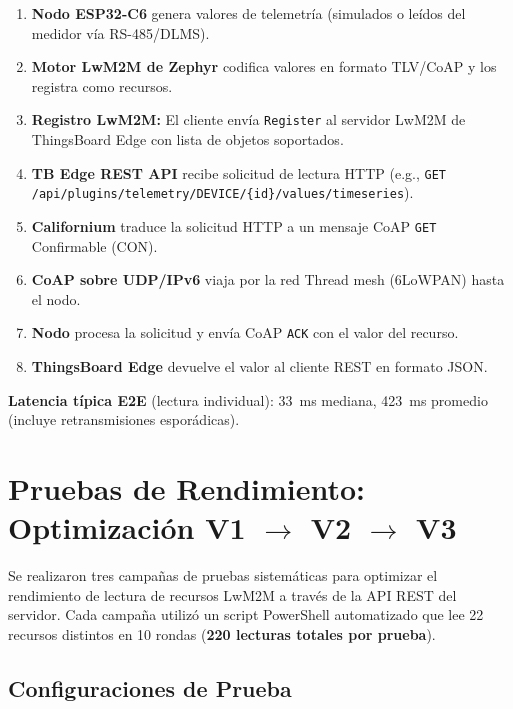 \documentclass[11pt,a4paper]{article}
\begin{document}
\begin{enumerate}[leftmargin=1.5cm]
    \item \textbf{Nodo ESP32-C6} genera valores de telemetría (simulados o leídos del medidor vía RS-485/DLMS).
    \item \textbf{Motor LwM2M de Zephyr} codifica valores en formato TLV/CoAP y los registra como recursos.
    \item \textbf{Registro LwM2M:} El cliente envía \texttt{Register} al servidor LwM2M de ThingsBoard Edge con lista de objetos soportados.
    \item \textbf{TB Edge REST API} recibe solicitud de lectura HTTP (e.g., \texttt{GET /api/plugins/telemetry/DEVICE/\{id\}/values/timeseries}).
    \item \textbf{Californium} traduce la solicitud HTTP a un mensaje CoAP \texttt{GET} Confirmable (CON).
    \item \textbf{CoAP sobre UDP/IPv6} viaja por la red Thread mesh (6LoWPAN) hasta el nodo.
    \item \textbf{Nodo} procesa la solicitud y envía CoAP \texttt{ACK} con el valor del recurso.
    \item \textbf{ThingsBoard Edge} devuelve el valor al cliente REST en formato JSON.
\end{enumerate}

\noindent\textbf{Latencia típica E2E} (lectura individual): \SI{33}{\milli\second} mediana, \SI{423}{\milli\second} promedio (incluye retransmisiones esporádicas).

\section{Pruebas de Rendimiento: Optimización V1 $\rightarrow$ V2 $\rightarrow$ V3}

Se realizaron tres campañas de pruebas sistemáticas para optimizar el rendimiento de lectura de recursos LwM2M a través de la API REST del servidor. Cada campaña utilizó un script PowerShell automatizado que lee 22 recursos distintos en 10 rondas (\textbf{220 lecturas totales por prueba}).

\subsection{Configuraciones de Prueba}
\end{document}
